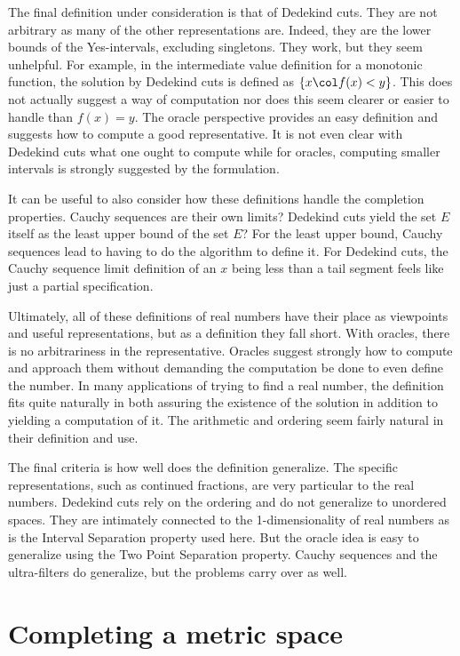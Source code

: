 \documentclass[12pt]{article}
\theoremstyle{remark}
\begin{document}
The final definition under consideration is that of Dedekind cuts. They are not arbitrary as many of the other representations are. Indeed, they are the lower bounds of the Yes-intervals, excluding singletons. They work, but they seem unhelpful. For example, in the intermediate value definition for a monotonic function, the solution by Dedekind cuts is defined as $\{x \col f(x) < y\}$. This does not actually suggest a way of computation nor does this seem clearer or easier to handle than $f(x) = y$. The oracle perspective provides an easy definition and suggests how to compute a good representative. It is not even clear with Dedekind cuts what one ought to compute while for oracles, computing smaller intervals is strongly suggested by the formulation. 

It can be useful to also consider how these definitions handle the completion properties. Cauchy sequences are their own limits? Dedekind cuts yield the set $E$ itself as the least upper bound of the set $E$? For the least upper bound, Cauchy sequences lead to having to do the algorithm to define it. For Dedekind cuts, the Cauchy sequence limit definition of an $x$ being less than a tail segment feels like just a partial specification. 

Ultimately, all of these definitions of real numbers have their place as viewpoints and useful representations, but as a definition they fall short. With oracles, there is no arbitrariness in the representative. Oracles suggest strongly how to compute and approach them without demanding the computation be done to even define the number. In many applications of trying to find a real number, the definition fits quite naturally in both assuring the existence of the solution in addition to yielding a computation of it. The arithmetic and ordering seem fairly natural in their definition and use. 

The final criteria is how well does the definition generalize. The specific representations, such as continued fractions, are very particular to the real numbers. Dedekind cuts rely on the ordering and do not generalize to unordered spaces. They are intimately connected to the 1-dimensionality of real numbers as is the Interval Separation property used here. But the oracle idea is easy to generalize using the Two Point Separation property. Cauchy sequences and the ultra-filters do generalize, but the problems carry over as well. 

\section{Completing a metric space}
\end{document}
